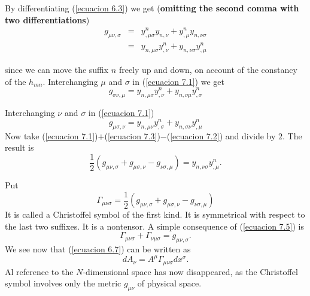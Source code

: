 By differentiating (\ref{ecuacion 6.3}) we get (\textbf{omitting the second 
comma with two differentiations})
\begin{equation}
 \label{ecuacion 7.1}
 \begin{array}{rcl}
g_{\mu\nu,\sigma} & = & y^n_{,\mu\sigma} y_{n,\nu} +
                    y^n_{,\mu} y_{n,\nu\sigma} \\
                  & = & y_{n,\mu\sigma} y^n_{,\nu} +
                     y_{n,\nu\sigma} y^n_{,\mu}
\end{array}
\end{equation}

since we can move the suffix $n$ freely up and down, on account of the 
constancy of the $h_{mn}$. Interchanging $\mu$ and $\sigma$ in (\ref{ecuacion 
7.1}) we get 
\begin{equation}
 \label{ecuacion 7.2}
 g_{\sigma\nu,\mu} = y_{n,\mu\sigma} y^n_{,\nu} + y_{n,\nu\mu} y^n_{,\sigma} 
\end{equation}

Interchanging $\nu$ and $\sigma$ in (\ref{ecuacion 7.1})
\begin{equation}
 \label{ecuacion 7.3}
 g_{\mu\sigma,\nu} = y_{n,\mu\nu} y^n_{,\sigma} + y_{n,\sigma\nu} y^n_{,\mu} 
\end{equation}
Now take (\ref{ecuacion 7.1})$+$(\ref{ecuacion 7.3})$-$(\ref{ecuacion 7.2}) and 
divide by $2$. The result is
\begin{equation}
 \label{ecuacion 7.4}
 \frac{1}{2} \left( g_{\mu\nu,\sigma} + g_{\mu\sigma,\nu} - g_{\nu\sigma,\mu}  
\right) = y_{n,\nu\sigma}y^n_{,\mu}.
\end{equation}

Put
\begin{equation}
 \label{ecuacion 7.5}
 \Gamma_{\mu\nu\sigma} = \frac{1}{2}\left(
    g_{\mu\nu,\sigma} + g_{\mu\sigma,\nu} - g_{\nu \sigma,\mu}
 \right)
\end{equation}
It is called a Christoffel symbol of the first kind. It is symmetrical with 
respect to the last two suffixes. It is a nontensor. A simple consequence of 
(\ref{ecuacion 7.5}) is
\begin{equation}
 \label{ecuacion 7.6}
 \Gamma_{\mu\nu\sigma} + \Gamma_{\nu\mu\sigma} = g_{\mu\nu,\sigma}.
\end{equation}
We see now that (\ref{ecuacion 6.7}) can be written as
\begin{equation}
 \label{ecuacion 7.7}
 d A_{\nu} = A^\mu \Gamma_{\mu\nu\sigma} dx^\sigma.
\end{equation}
Al reference to the $N$-dimensional space has now disappeared, as the 
Christoffel symbol involves only the metric $g_{\mu\nu}$ of physical space.

